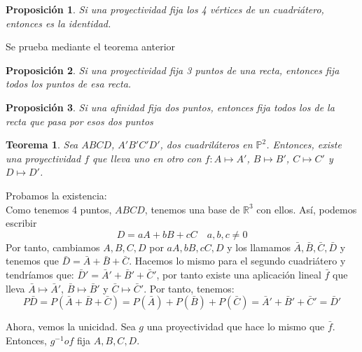 \documentclass[11pt, a4paper]{article}
\makeatletter
\newif\IfInSansMode
\let\oldsf\sffamily
\renewcommand*{\sffamily}{\oldsf\mathversion{sans}\InSansModetrue}
\let\oldnorm\normalfont
\renewcommand*{\normalfont}{\oldnorm\InSansModefalse\mathversion{normal}}
\renewenvironment{proof}[1][\proofname] {\vspace{-15pt}\par\pushQED{\qed}\normalfont\topsep6\p@\@plus6\p@\relax\trivlist\item[\hskip\labelsep\it#1\@addpunct{.}]\ignorespaces}{\popQED\endtrivlist\@endpefalse}
\newcommand{\R}{\mathbb{R}}
\renewenvironment{proof}[1][\proofname] {\par\pushQED{\qed}\normalfont\topsep6\p@\@plus6\p@\relax\trivlist\item[\hskip\labelsep\itshape\sffamily#1\@addpunct{.}]\ignorespaces}{\popQED\endtrivlist\@endpefalse}
\theoremstyle{theorem-style}
\newtheorem{nth}{Teorema}[section]
\newtheorem{nprop}{Proposición}[section]
\theoremstyle{definition-style}
\theoremstyle{remark-style}
\theoremstyle{example-style}
\makeatother
\begin{document}
\begin{nprop}
	Si una proyectividad fija los 4 vértices de un cuadriátero, entonces es la identidad.
\end{nprop}
\begin{proof}
	Se prueba mediante el teorema anterior
\end{proof}
\begin{nprop}
	Si una proyectividad fija 3 puntos de una recta, entonces fija todos los puntos de esa recta.
\end{nprop}

\begin{nprop}
	Si una afinidad fija dos puntos, entonces fija todos los de la recta que pasa por esos dos puntos
	
\end{nprop}
\begin{nth}
	Sea $ABCD$, $A'B'C'D'$, dos cuadriláteros en $\mathbb P^2$. Entonces, existe una proyectividad $f$ que lleva uno en otro con $f:A\mapsto A'$, $B\mapsto B'$, $C \mapsto C'$ y $D\mapsto D'$.
\end{nth}
\begin{proof}
	Probamos la existencia:\\
	Como tenemos 4 puntos, $ABCD$, tenemos una base de $\R^3$ con ellos. Así, podemos escribir
	\[
	D = aA + bB +cC \quad a,b,c\ne 0
	\]
	Por tanto, cambiamos $A,B,C,D$ por $aA,bB,cC,D$ y los llamamos $\bar A,\bar B, \bar C, \bar D$ y tenemos que $\bar D = \bar A + \bar B + \bar C$. Hacemos lo mismo para el segundo cuadriátero y tendríamos que:
	$\bar D ' = \bar A ' + \bar B ' + \bar C'$, por tanto existe una aplicación lineal $\bar f$ que lleva $\bar A \mapsto \bar A '$, $\bar B \mapsto \bar B'$ y $\bar C \mapsto \bar C'$. Por tanto, tenemos:
	\[
	P{\bar D} = P( \bar A + \bar B + \bar C) = P(\bar A) + P(\bar B) + P(\bar C) = \bar A ' + \bar B ' + \bar C' = \bar D'
	\]
	
	Ahora, vemos la unicidad. Sea $g$ una proyectividad que hace lo mismo que $\bar f$. Entonces, $g^{-1} o f$ fija $A,B,C,D$.
\end{proof}
\end{document}
